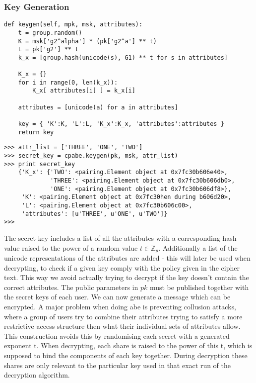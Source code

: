 \subsubsection{Key Generation}
\begin{verbatim}
def keygen(self, mpk, msk, attributes):        
    t = group.random()
    K = msk['g2^alpha'] * (pk['g2^a'] ** t)
    L = pk['g2'] ** t
    k_x = [group.hash(unicode(s), G1) ** t for s in attributes]
    
    K_x = {}
    for i in range(0, len(k_x)):
        K_x[ attributes[i] ] = k_x[i]    

    attributes = [unicode(a) for a in attributes]

    key = { 'K':K, 'L':L, 'K_x':K_x, 'attributes':attributes }
    return key

\end{verbatim}


\begin{lstlisting}
>>> attr_list = ['THREE', 'ONE', 'TWO']
>>> secret_key = cpabe.keygen(pk, msk, attr_list)
>>> print secret_key
    {'K_x': {'TWO': <pairing.Element object at 0x7fc30b606e40>, 
             'THREE': <pairing.Element object at 0x7fc30b606db0>, 
             'ONE': <pairing.Element object at 0x7fc30b606df8>}, 
     'K': <pairing.Element object at 0x7fc30hen during b606d20>, 
     'L': <pairing.Element object at 0x7fc30b606c00>, 
     'attributes': [u'THREE', u'ONE', u'TWO']}
>>> 
\end{lstlisting}

The secret key includes a list of all the attributes with a corresponding hash value raised to the power of a random value $t \in \mathbb{Z}_p$. Additionally a list of the unicode representations of the attributes are added - this will later be used when decrypting, to check if a given key comply with the policy given in the cipher text. This way we avoid actually trying to decrypt if the key doesn't contain the correct attributes. The public parameters in $pk$ must be published together with the secret keys of each user. We can now generate a message which can be encrypted. A major problem when doing \gls{abe} is preventing collusion attacks, where a group of users try to combine their attributes trying to satisfy a more restrictive access structure then what their individual sets of attributes allow. This construction avoids this by randomising each secret with a generated exponent t. When decrypting, each share is raised to the power of this t, which is supposed to bind the components of each key together. During decryption these shares are only relevant to the particular key used in that exact run of the decryption algorithm.



